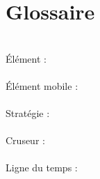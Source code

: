\chapter{Glossaire}
\label{s:glossaire}

\\
Élément : \\
\\
Élément mobile : \\
\\
Stratégie : \\
\\
Cruseur : \\
\\
Ligne du temps : \\
\\